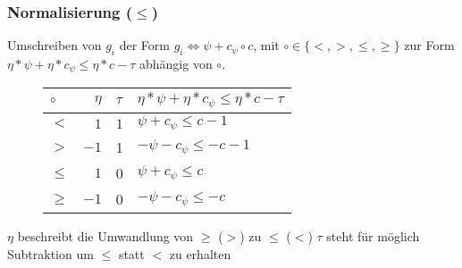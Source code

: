 \begin{frame} %
	\frametitle{Normalisierung ($\le$)}
	Umschreiben von $g_i$ der Form $g_i \Leftrightarrow \psi + c_{\psi} \circ c$, mit $\circ \in \{<,>,\le,\ge\}$ zur Form $ \eta*\psi + \eta*c_{\psi} \le \eta*c-\tau$ abh\"angig von $\circ$.\newline
	\begin{figure}[H]
		\vspace*{-1cm}
		\centering
		\begin{tabular}{|l|r|l|l|}
			\hline
			$\circ$ 	& $\eta$ 	& $\tau$ 	&  $ \eta*\psi + \eta*c_{\psi} \le \eta*c-\tau$ \\ 
			\hline \hline
			$<$ 		& $1$ 		&  $1$ 		& $\psi + c_{\psi} \le c - 1$ \\ \hline
			$>$ 		& $-1$		&  1 		& $-\psi - c_{\psi} \le -c -1 $ \\ \hline
			$\le$ 		& $1$ 		&  0 		& $\psi + c_{\psi} \le c$ \\ \hline
			$\ge$ 		& $-1$ 		&  0 		& $-\psi - c_{\psi} \le -c$ \\ \hline
		\end{tabular}
	\end{figure}
	\footnotesize
	$\eta$ beschreibt die Umwandlung von $\ge$ ($>$) zu $\le$ ($<$)\newline
	$\tau$ steht f\"ur m\"oglich Subtraktion um $\le$ statt $<$ zu erhalten
\end{frame}

